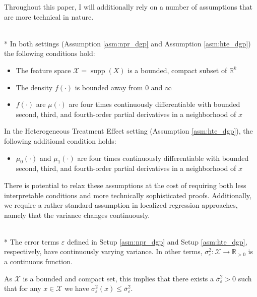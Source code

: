 Throughout this paper, I will additionally rely on a number of assumptions that are more technical in nature.
\begin{boxD}
	\begin{asm}\label{asm:technical}\mbox{}\\*
		In both settings (Assumption \ref{asm:npr_dgp} and Assumption \ref{asm:hte_dgp}) the following conditions hold:
		\begin{itemize}
			\item The feature space $\mathcal{X} = \operatorname{supp}(X)$ is a bounded, compact subset of $\mathbb{R}^k$
			\item The density $f(\cdot)$ is bounded away from 0 and $\infty$
			\item $f(\cdot)$ are $\mu(\cdot)$ are four times continuously differentiable with bounded second, third, and fourth-order partial derivatives in a neighborhood of $x$
		\end{itemize}
		In the Heterogeneous Treatment Effect setting (Assumption \ref{asm:hte_dgp}), the following additional condition holds:
		\begin{itemize}
			\item $\mu_0(\cdot)$ and $\mu_1(\cdot)$ are four times continuously differentiable with bounded second, third, and fourth-order partial derivatives in a neighborhood of $x$
		\end{itemize}
	\end{asm}
\end{boxD}
There is potential to relax these assumptions at the cost of requiring both less interpretable conditions and more technically sophisticated proofs.
Additionally, we require a rather standard assumption in localized regression approaches, namely that the variance changes continuously.
\begin{boxD}
	\begin{asm}\label{asm:errors}\mbox{}\\*
		The error terms $\varepsilon$ defined in Setup \ref{asm:npr_dgp} and Setup \ref{asm:hte_dgp}, respectively, have continuously varying variance.
		In other terms,	$\sigma^2_{\varepsilon}: \mathcal{X} \rightarrow \mathbb{R}_{>0}$ is a continuous function.
	\end{asm}
\end{boxD}
As $\mathcal{X}$ is a bounded and compact set, this implies that there exists a $\overline{\sigma}_{\varepsilon}^2 > 0$ such that for any $x \in \mathcal{X}$ we have $\sigma^{2}_{\varepsilon}\left(x\right) \leq \overline{\sigma}_{\varepsilon}^2$.
